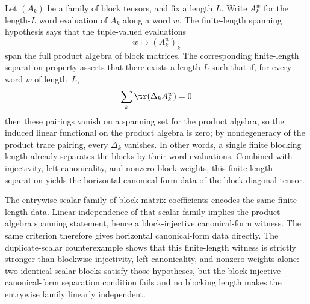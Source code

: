 \begin{remark}%
    \label{rem:word_tuple_span_top}
    \leanok
    Let $(A_k)$ be a family of block tensors, and fix a length $L$.
    Write $A_k^w$ for the length-$L$ word evaluation of $A_k$ along a word $w$.
    The finite-length spanning hypothesis says that the tuple-valued evaluations
    \[
        w \longmapsto (A_k^w)_k
    \]
    span the full product algebra of block matrices.
    The corresponding finite-length separation property asserts that there
    exists a length $L$ such that if, for every word $w$ of length~$L$,
    \[
        \sum_k \tr(\Delta_k A_k^w) = 0
    \]
    then these pairings vanish on a spanning set for the product algebra, so
    the induced linear functional on the product algebra is zero; by
    nondegeneracy of the product trace pairing, every $\Delta_k$ vanishes.
    In other words, a single finite blocking length already separates the blocks
    by their word evaluations. Combined with injectivity, left-canonicality, and
    nonzero block weights, this finite-length separation yields the horizontal
    canonical-form data of the block-diagonal tensor.

    The entrywise scalar family of block-matrix coefficients encodes the same
    finite-length data. Linear independence of that scalar family implies the
    product-algebra spanning statement, hence a block-injective
    canonical-form witness. The same criterion therefore gives horizontal
    canonical-form data directly.
    The duplicate-scalar counterexample shows that this finite-length witness
    is strictly stronger than blockwise injectivity, left-canonicality, and
    nonzero weights alone: two identical scalar blocks satisfy those hypotheses,
    but the block-injective canonical-form separation condition fails and no
    blocking length makes the entrywise family linearly independent.


\end{remark}
